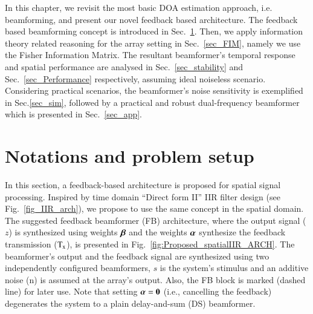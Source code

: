 In this chapter, we revisit the most basic DOA estimation approach, i.e. beamforming, and present our novel feedback based architecture.
The feedback based beamforming concept is introduced in Sec.~\ref{sec_introduceFeedback}.
Then, we apply information theory related reasoning for the array setting in Sec.~\ref{sec_FIM}, namely we use the Fisher Information Matrix.
The resultant beamformer's temporal response and spatial performance are analysed in Sec.~\ref{sec_stability} and Sec.~\ref{sec_Performance} respectively, assuming ideal noiseless scenario.
Considering practical scenarios, the beamformer's noise sensitivity is exemplified in Sec.\ref{sec_sim}, followed by a practical and robust dual-frequency beamformer which is presented in Sec.~\ref{sec_app}.

\section{Notations and problem setup}
\label{sec_introduceFeedback}
In this section, a feedback-based architecture is proposed for spatial signal processing.
Inspired by time domain ``Direct form II'' IIR filter design (see Fig.~\ref{fig_IIR_arch}), 
we propose to use the same concept in the spatial domain.
The suggested feedback beamformer (FB) architecture, where the output signal ($z$) is synthesized using weights $\boldsymbol{\beta}$ and the weights $\boldsymbol{\alpha}$ synthesize the feedback transmission ($\text{T}_{\text{x}}$), is presented in Fig.~\ref{fig:Proposed_spatialIIR_ARCH}. The beamformer's output and the feedback signal are synthesized using two independently configured beamformers, $s$ is the system's stimulus and an additive noise (n) is assumed at the array's output.
Also, the FB block is marked (dashed line) for later use.
Note that setting $\boldsymbol{\alpha}=\boldsymbol{0}$ (i.e., cancelling the feedback) degenerates the system to a plain delay-and-sum (DS) beamformer.
